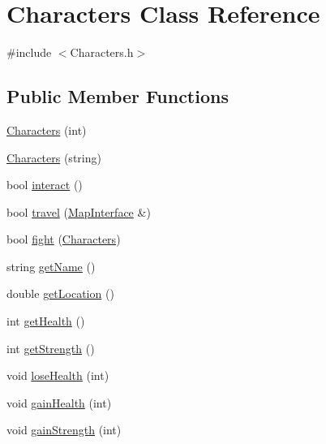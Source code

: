 \hypertarget{classCharacters}{\section{Characters Class Reference}
\label{classCharacters}
}


{\ttfamily \#include $<$Characters.\-h$>$}

\subsection*{Public Member Functions}
\begin{DoxyCompactItemize}
\item 
\hyperlink{classCharacters_a982bd095e88521e33817bc3ac4eb9607}{Characters} (int)
\item 
\hyperlink{classCharacters_a265d04d1ad3a6f8d0ca8fd619cfa507a}{Characters} (string)
\item 
bool \hyperlink{classCharacters_a9ba4cc578a1a39b99aa768687a4f61d3}{interact} ()
\item 
bool \hyperlink{classCharacters_a4ebc19878bbf951f7c5f2bcebca7a7f8}{travel} (\hyperlink{classMapInterface}{Map\-Interface} \&)
\item 
bool \hyperlink{classCharacters_af427bea62ac1676a045b99e91a2955ee}{fight} (\hyperlink{classCharacters}{Characters})
\item 
string \hyperlink{classCharacters_ade67cb33a8d5a9f71cf5d74d36c9334c}{get\-Name} ()
\item 
double \hyperlink{classCharacters_a01416ed6aa653ac13d321debe0d87710}{get\-Location} ()
\item 
int \hyperlink{classCharacters_a4fcf7eddcf088020e4f6fec769c2f656}{get\-Health} ()
\item 
int \hyperlink{classCharacters_a6903ebf441ed1de576019be728915a39}{get\-Strength} ()
\item 
void \hyperlink{classCharacters_afcdf7a6bd55be44e1da4e8b82418c162}{lose\-Health} (int)
\item 
void \hyperlink{classCharacters_ab5e230273f1224917c45d64bd475b2b3}{gain\-Health} (int)
\item 
void \hyperlink{classCharacters_a78c7c420c9fb868cc8b43874d3d89abd}{gain\-Strength} (int)
\end{DoxyCompactItemize}


